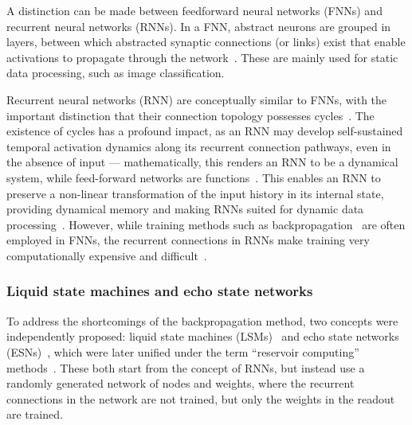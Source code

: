 A distinction can be made between feedforward neural networks (FNNs) and recurrent neural networks (RNNs).
In a FNN, abstract neurons are grouped in layers, between which abstracted synaptic connections (or links) exist that enable activations to propagate through the network~\cite{lukovsevivcius2009reservoir}.
These are mainly used for static data processing, such as image classification. \par

Recurrent neural networks (RNN) are conceptually similar to FNNs, with the important distinction that their connection topology possesses cycles~\cite{lukovsevivcius2009reservoir}.
The existence of cycles has a profound impact, as an RNN may develop self-sustained temporal activation dynamics along its recurrent connection pathways, even in the absence of input --- mathematically, this renders an RNN to be a dynamical system, while feed-forward networks are functions~\cite{lukovsevivcius2009reservoir}. %
This enables an RNN to preserve a non-linear transformation of the input history in its internal state, providing dynamical memory and making RNNs suited for dynamic data processing~\cite{lukovsevivcius2009reservoir,RC_RecentAdvances}.
However, while training methods such as backpropagation~\cite{Backpropagation} are often employed in FNNs, the recurrent connections in RNNs make training very computationally expensive and difficult~\cite{EvaluatingRestrictedESNs,Moon_2021,RC_SuperconductingElectronics}.



\subsubsection{Liquid state machines and echo state networks}
To address the shortcomings of the backpropagation method, two concepts were independently proposed: liquid state machines (LSMs)~\cite{maass_LSM} and echo state networks (ESNs)~\cite{jaeger2001echo}, which were later unified under the term ``reservoir computing'' methods~\cite{RC_unification}.
These both start from the concept of RNNs, but instead use a randomly generated network of nodes and weights, where the recurrent connections in the network are not trained, but only the weights in the readout are trained.


